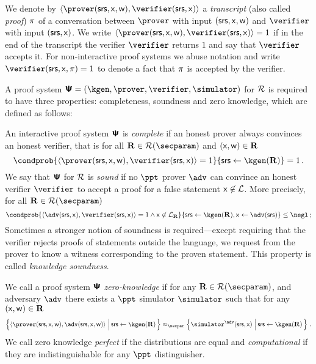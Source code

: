 We denote by $\ip{\prover(\srs, \inp, \wit)}{\verifier(\srs,\inp)}$ a
\emph{transcript} (also called \emph{proof}) $\pi$ of a conversation
between $\prover$ with input $(\mathsf{srs}, \mathsf{x}, \mathsf{w})$ and $\verifier$ with input
$(\mathsf{srs}, \mathsf{x})$. We write
$\ip{\prover (\srs, \inp, \wit)}{\verifier(\srs, \inp)} = 1$ if in the end of
the transcript the verifier $\verifier$ returns $1$ and say that $\verifier$
accepts it.  For non-interactive proof systems we abuse notation and write
$\verifier(\srs, \inp, \zkproof) = 1$ to denote a fact that $\pi$ is
accepted by the verifier.  

A proof system $\proofsystem = (\kgen, \prover, \verifier, \simulator)$ for
$\mathcal{R}$ is required to have three properties: completeness, soundness and zero
knowledge, which are defined as follows:

  An interactive proof system $\bm{\mathsf{\Psi}}$ is
  \emph{complete} if an honest prover always convinces an honest verifier, that
  is for all $\REL \in \RELGEN(\secparam)$ and $(\mathsf{x}, \mathsf{w}) \in \mathbf{R}$
	\[
		\condprob{\ip{\prover (\srs, \inp, \wit)}{\verifier (\srs,
        \inp)} = 1}{\srs \gets \kgen(\REL)} = 1\,.
	\]
    We say that $\bm{\mathsf{\Psi}}$ for $\mathcal{R}$ is \emph{sound} if no
  $\ppt$ prover $\adv$ can convince an honest verifier $\verifier$ to accept a
  proof for a false statement $\mathsf{x} \not\in\mathcal{L}$. More precisely, for
  all $\REL \in \RELGEN(\secparam)$
	\[
    \condprob{\ip{\adv(\srs, \inp)}{\verifier(\srs, \inp)} = 1 \land \inp
      \not\in \LANG_\REL}{\srs \gets \kgen(\REL), \inp \gets \adv(\srs)} \leq
    \negl\,;
	\]
Sometimes a stronger notion of soundness is required---except requiring that the
verifier rejects proofs of statements outside the language, we request from the
prover to know a witness corresponding to the proven statement. This property is
called \emph{knowledge soundness}.%
 
  We call a proof system $\bm{\mathsf{\Psi}}$
\emph{zero-knowledge} if for any $\REL \in \RELGEN(\secparam)$, and adversary
$\adv$ there exists a $\ppt$ simulator $\simulator$ such that for any
$(\mathsf{x}, \mathsf{w}) \in \mathbf{R}$
\begin{multline*}
	  \left\{\ip{\prover(\srs, \inp, \wit)}{\adv(\srs, \inp, \wit)}
      \,\left|\, \srs \gets \kgen(\REL)\COMMENT{, (\inp, \wit) \gets \adv(\REL,
          \srs)}\vphantom{\simulator^\adv}\right.\right\} \approx_\secpar
		\left\{\simulator^{\adv}(\srs, \inp)\,\left|\, \srs \gets
        \kgen(\REL)\COMMENT{, (\inp, \wit) \gets \adv(\REL,
          \srs)}\vphantom{\simulator^\adv}\right.\right\}\,.
\end{multline*}
We call zero knowledge \emph{perfect} if the distributions are equal and
\emph{computational} if they are indistinguishable for any $\ppt$ distinguisher.

